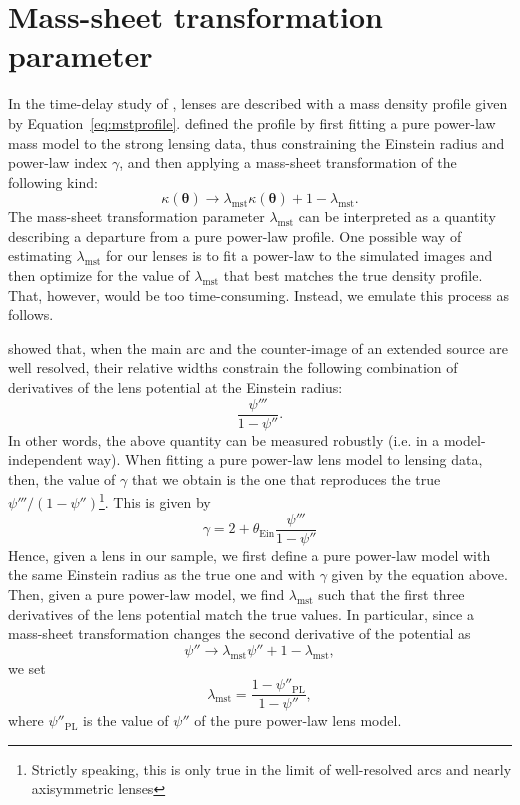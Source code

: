 \documentclass{aa}
\def\tein{\theta_{\mathrm{Ein}}}
\def\lmst{\lambda_{\mathrm{mst}}}
\def\Eref#1{Equation~\ref{#1}\xspace}
\begin{document}
\section{Mass-sheet transformation parameter}\label{sect:appendixc}

In the time-delay study of \citet{Bir++20}, lenses are described with a mass density profile given by \Eref{eq:mstprofile}.
\citet{Bir++20} defined the profile by first fitting a pure power-law mass model to the strong lensing data, thus constraining the Einstein radius and power-law index $\gamma$, and then applying a mass-sheet transformation of the following kind:
\begin{equation}\label{eq:mst}
\kappa(\boldsymbol\theta) \rightarrow \lmst\kappa(\boldsymbol\theta) + 1 - \lmst.
\end{equation}
The mass-sheet transformation parameter $\lmst$ can be interpreted as a quantity describing a departure from a pure power-law profile.
One possible way of estimating $\lmst$ for our lenses is to fit a power-law to the simulated images and then optimize for the value of $\lmst$ that best matches the true density profile. That, however, would be too time-consuming. Instead, we emulate this process as follows.

\citet{Son18} showed that, when the main arc and the counter-image of an extended source are well resolved, their relative widths constrain the following combination of derivatives of the lens potential at the Einstein radius:
\begin{equation}\label{eq:invariant}
\frac{\psi'''}{1 - \psi''}.
\end{equation}
In other words, the above quantity can be measured robustly (i.e. in a model-independent way).
When fitting a pure power-law lens model to lensing data, then, the value of $\gamma$ that we obtain is the one that reproduces the true $\psi'''/(1-\psi'')$\footnote{Strictly speaking, this is only true in the limit of well-resolved arcs and nearly axisymmetric lenses}. This is given by
\begin{equation}
\gamma = 2 + \tein \frac{\psi'''}{1-\psi''}
\end{equation}
Hence, given a lens in our sample, we first define a pure power-law model with the same Einstein radius as the true one and with $\gamma$ given by the equation above. 
Then, given a pure power-law model, we find $\lmst$ such that the first three derivatives of the lens potential match the true values.
In particular, since a mass-sheet transformation changes the second derivative of the potential as
\begin{equation}
\psi'' \rightarrow \lmst\psi'' + 1 - \lmst,
\end{equation}
we set
\begin{equation}
\lmst = \frac{1 - \psi''_{\mathrm{PL}}}{1 - \psi''},
\end{equation}
where $\psi''_{\mathrm{PL}}$ is the value of $\psi''$ of the pure power-law lens model.
\end{document}
